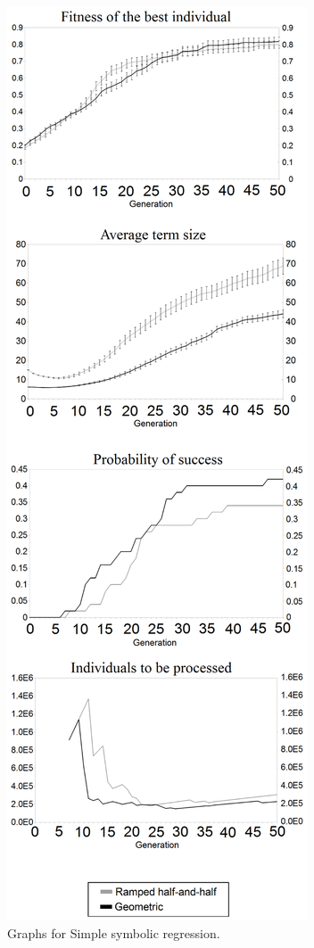 \documentclass[conference]{IEEEtran}
\begin{document}
\begin{figure}[!ht]
  \centering
  \caption{Graphs for Simple symbolic regression.}
  \includegraphics[scale=0.115]{imgs/SSR.eps}
\end{figure}
\end{document}
